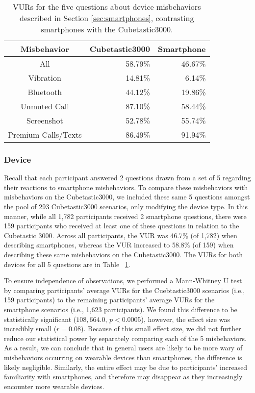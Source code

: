 

\begin{table}[t]
\begin{center}
\begin{tabular}{| c | r | r |}
\hline
 Misbehavior &  Cubetastic3000 & Smartphone \\
 \hline
 \hline
 All & 58.79\% & 46.67\%\\
 \hline
Vibration & 14.81\%  &  6.14\%\\
Bluetooth & 44.12\%  &  19.86\%\\
Unmuted Call & 87.10\%  &  58.44\%\\
Screenshot & 52.78\%  & 55.74\%\\
Premium Calls/Texts & 86.49\%  &  91.94\%\\ 
\hline
\end{tabular}
\caption{VURs for the five questions about device misbehaviors described in Section \ref{sec:smartphones}, contrasting smartphones with the Cubetastic3000.}
\label{deviceVUR}
\end{center}
\end{table}

\subsubsection{Device}
Recall that each participant answered 2 questions drawn from a set of 5 regarding their reactions to smartphone misbehaviors. To compare these misbehaviors with misbehaviors on the Cubetastic3000, we included these same 5 questions amongst the pool of 293 Cubetastic3000 scenarios, only modifying the device type. In this manner, while all 1,782 participants received 2 smartphone questions, there were 159 participants who received at least one of these questions in relation to the Cubetastic 3000. Across all participants, the VUR was 46.7\% (of 1,782) when describing smartphones, whereas the VUR increased to 58.8\% (of 159) when describing these same misbehaviors on the Cubetastic3000. The VURs for both devices for all 5 questions are in Table ~\ref{deviceVUR}.

To ensure independence of observations, we performed a Mann-Whitney U test by comparing participants' average VURs for the Cuebtastic3000 scenarios (i.e., 159 participants) to the remaining participants' average VURs for the smartphone scenarios (i.e., 1,623 participants). We found this difference to be statistically significant ($108,664.0$, $p<0.0005$), however, the effect size was incredibly small ($r=0.08$). Because of this small effect size, we did not further reduce our statistical power by separately comparing each of the 5 misbehaviors. As a result, we can conclude that in general users are likely to be more wary of misbehaviors occurring on wearable devices than smartphones, the difference is likely negligible. Similarly, the entire effect may be due to participants' increased familiarity with smartphones, and therefore may disappear as they increasingly encounter more wearable devices.

